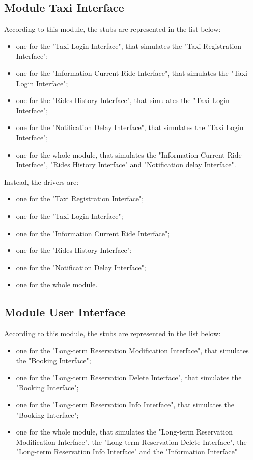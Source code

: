 	\subsection{Module Taxi Interface}
		According to this module, the stubs are represented in the list below:
		\begin{itemize}
			\item one for the "Taxi Login Interface", that simulates the "Taxi Registration Interface";
			\item one for the "Information Current Ride Interface", that simulates the "Taxi Login Interface";
			\item one for the "Rides History Interface", that simulates the "Taxi Login Interface";
			\item one for the "Notification Delay Interface", that simulates the "Taxi Login Interface";
			\item one for the whole module, that simulates the "Information Current Ride Interface", "Rides History Interface" and "Notification delay Interface".
		\end{itemize}
		
		Instead, the drivers are:
		\begin{itemize}
			\item one for the "Taxi Registration Interface";
			\item one for the "Taxi Login Interface";
			\item one for the "Information Current Ride Interface";
			\item one for the "Rides History Interface";
			\item one for the "Notification Delay Interface";
			\item one for the whole module.
		\end{itemize}
	
	\subsection{Module User Interface}
		According to this module, the stubs are represented in the list below:
		\begin{itemize}
			\item one for the "Long-term Reservation Modification Interface", that simulates the "Booking Interface";
			\item one for the "Long-term Reservation Delete Interface", that simulates the "Booking Interface";
			\item one for the "Long-term Reservation Info Interface", that simulates the "Booking Interface";
			\item one for the whole module, that simulates the "Long-term Reservation Modification Interface", the "Long-term Reservation Delete Interface", the "Long-term Reservation Info Interface" and the "Information Interface"
		\end{itemize}
		
